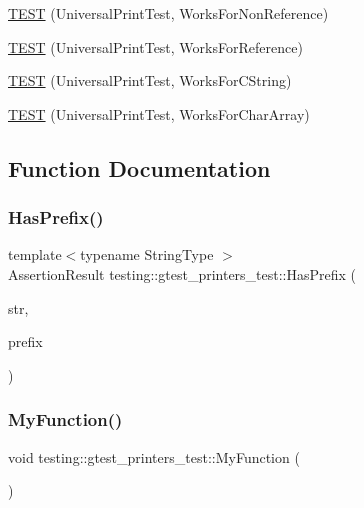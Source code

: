 \begin{DoxyCompactItemize}
\item 
\mbox{\hyperlink{namespacetesting_1_1gtest__printers__test_a43d4efc91c2ea7d8220891df9b0437df}{T\+E\+ST}} (Universal\+Print\+Test, Works\+For\+Non\+Reference)
\item 
\mbox{\hyperlink{namespacetesting_1_1gtest__printers__test_a58ad7c81884e852b09646764ce14a47e}{T\+E\+ST}} (Universal\+Print\+Test, Works\+For\+Reference)
\item 
\mbox{\hyperlink{namespacetesting_1_1gtest__printers__test_ac20aca012aca1ca9589dbf7483fbbbd1}{T\+E\+ST}} (Universal\+Print\+Test, Works\+For\+C\+String)
\item 
\mbox{\hyperlink{namespacetesting_1_1gtest__printers__test_a23a9eda97679bfc29c87b8de17cc35bf}{T\+E\+ST}} (Universal\+Print\+Test, Works\+For\+Char\+Array)
\end{DoxyCompactItemize}


\subsection{Function Documentation}
\mbox{\label{namespacetesting_1_1gtest__printers__test_abbd436200da6c80944c8a7504fb56ea1}} 
\subsubsection{\texorpdfstring{HasPrefix()}{HasPrefix()}}
{\footnotesize\ttfamily template$<$typename String\+Type $>$ \\
Assertion\+Result testing\+::gtest\+\_\+printers\+\_\+test\+::\+Has\+Prefix (\begin{DoxyParamCaption}\item[{const String\+Type \&}]{str,  }\item[{const String\+Type \&}]{prefix }\end{DoxyParamCaption})}

\mbox{\label{namespacetesting_1_1gtest__printers__test_adf0e590d6776ecb7095a989ff2272d7b}} 
\subsubsection{\texorpdfstring{MyFunction()}{MyFunction()}}
{\footnotesize\ttfamily void testing\+::gtest\+\_\+printers\+\_\+test\+::\+My\+Function (\begin{DoxyParamCaption}\item[{int}]{ }\end{DoxyParamCaption})}

